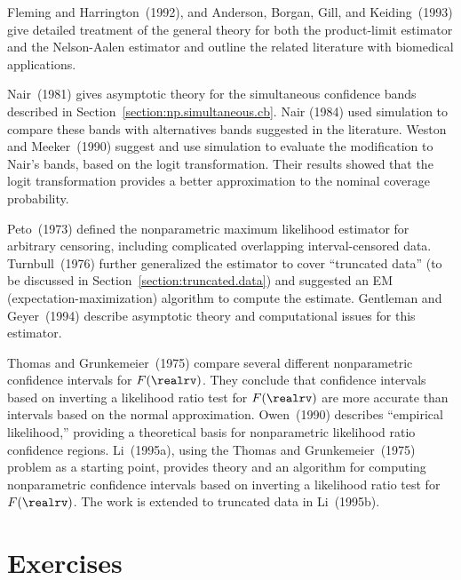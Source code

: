 Fleming and Harrington~(1992), and Anderson, Borgan, Gill, and
Keiding~(1993) give detailed treatment of the general theory for both
the product-limit estimator and the Nelson-Aalen estimator and outline
the related literature with biomedical applications.

Nair~(1981) gives asymptotic theory for the simultaneous confidence
bands described in Section~\ref{section:np.simultaneous.cb}. Nair
(1984) used simulation to compare these bands with alternatives
bands suggested in the literature.  Weston and Meeker~(1990)
suggest and use simulation to evaluate the modification to Nair's
bands, based on the logit transformation.  Their results showed that
the logit transformation provides a better approximation to the
nominal coverage probability.

Peto~(1973) defined the nonparametric maximum likelihood estimator for
arbitrary censoring, including complicated overlapping
interval-censored data.  Turnbull~(1976) further generalized the
estimator to cover ``truncated data'' (to be discussed in
Section~\ref{section:truncated.data}) and suggested an EM
(expectation-maximization) algorithm to compute the estimate.
Gentleman and Geyer~(1994) describe asymptotic theory and
computational issues for this estimator.

Thomas and Grunkemeier~(1975) compare several different
nonparametric confidence intervals for $F(\realrv)$. They
conclude that confidence intervals based on inverting a likelihood
ratio test for $F(\realrv)$ are more accurate than intervals based on
the normal approximation. Owen~(1990) describes ``empirical
likelihood,'' providing a theoretical basis for nonparametric
likelihood ratio confidence regions.  Li~(1995a), using the Thomas and
Grunkemeier~(1975) problem as a starting point, provides theory and an
algorithm for computing nonparametric confidence intervals based on
inverting a likelihood ratio test for $F(\realrv)$. The work is
extended to truncated data in Li~(1995b).

\section*{Exercises}


